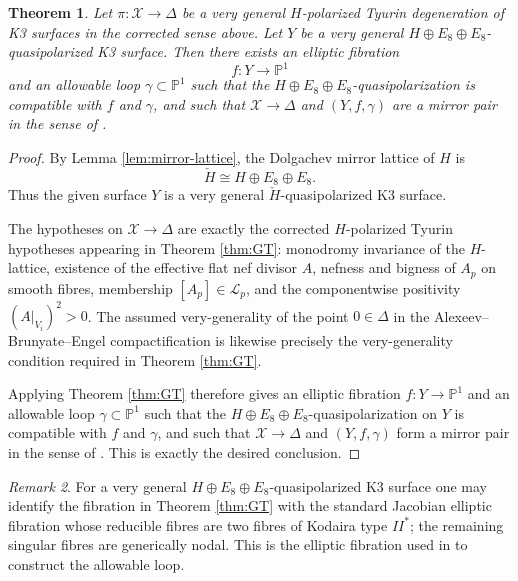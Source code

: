 \documentclass[11pt]{article}
\newtheorem{theorem}{Theorem}
\theoremstyle{remark}
\newtheorem{remark}[theorem]{Remark}
\newcommand{\PP}{\mathbb P}
\newcommand{\cL}{\mathcal L}
\newcommand{\cX}{\mathcal X}
\begin{document}
\begin{theorem}\label{thm:main}
Let \(\pi\colon \cX\to \Delta\) be a very general \(H\)-polarized Tyurin degeneration of K3 surfaces in the corrected sense above. Let \(Y\) be a very general \(H\oplus E_8\oplus E_8\)-quasipolarized K3 surface. Then there exists an elliptic fibration
\[
f\colon Y\to \PP^1
\]
and an allowable loop \(\gamma\subset \PP^1\) such that the \(H\oplus E_8\oplus E_8\)-quasipolarization is compatible with \(f\) and \(\gamma\), and such that \(\cX\to\Delta\) and \((Y,f,\gamma)\) are a mirror pair in the sense of \cite[Definition 5.1]{dfk3slpms}.
\end{theorem}

\begin{proof}
By Lemma \ref{lem:mirror-lattice}, the Dolgachev mirror lattice of \(H\) is
\[
\check H \cong H\oplus E_8\oplus E_8.
\]
Thus the given surface \(Y\) is a very general \(\check H\)-quasipolarized K3 surface.

The hypotheses on \(\cX\to\Delta\) are exactly the corrected \(H\)-polarized Tyurin hypotheses appearing in Theorem \ref{thm:GT}: monodromy invariance of the \(H\)-lattice, existence of the effective flat nef divisor \(A\), nefness and bigness of \(A_p\) on smooth fibres, membership \([A_p]\in \cL_p\), and the componentwise positivity \((A|_{V_i})^2>0\). The assumed very-generality of the point \(0\in\Delta\) in the Alexeev--Brunyate--Engel compactification is likewise precisely the very-generality condition required in Theorem \ref{thm:GT}.

Applying Theorem \ref{thm:GT} therefore gives an elliptic fibration \(f\colon Y\to \PP^1\) and an allowable loop \(\gamma\subset \PP^1\) such that the \(H\oplus E_8\oplus E_8\)-quasipolarization on \(Y\) is compatible with \(f\) and \(\gamma\), and such that \(\cX\to\Delta\) and \((Y,f,\gamma)\) form a mirror pair in the sense of \cite[Definition 5.1]{dfk3slpms}. This is exactly the desired conclusion.
\end{proof}

\begin{remark}
For a very general \(H\oplus E_8\oplus E_8\)-quasipolarized K3 surface one may identify the fibration in Theorem \ref{thm:GT} with the standard Jacobian elliptic fibration whose reducible fibres are two fibres of Kodaira type \(II^*\); the remaining singular fibres are generically nodal. This is the elliptic fibration used in \cite[\S 4]{dfk3slpms} to construct the allowable loop.
\end{remark}
\end{document}
